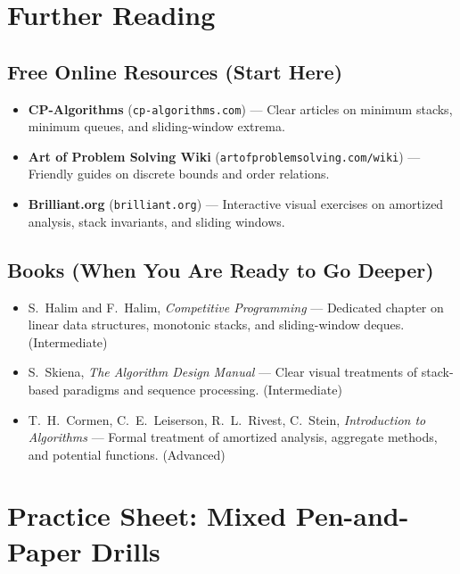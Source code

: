 \documentclass[11pt,a4paper]{article}
\theoremstyle{definition}
\newcounter{exercise}
\begin{document}
\section{Further Reading}

\subsection*{Free Online Resources (Start Here)}
\begin{itemize}
    \item \textbf{CP-Algorithms} (\texttt{cp-algorithms.com}) --- Clear articles on minimum stacks, minimum queues, and sliding-window extrema.
    \item \textbf{Art of Problem Solving Wiki} (\texttt{artofproblemsolving.com/wiki}) --- Friendly guides on discrete bounds and order relations.
    \item \textbf{Brilliant.org} (\texttt{brilliant.org}) --- Interactive visual exercises on amortized analysis, stack invariants, and sliding windows.
\end{itemize}

\subsection*{Books (When You Are Ready to Go Deeper)}
\begin{itemize}
    \item S.\ Halim and F.\ Halim, \emph{Competitive Programming} --- Dedicated chapter on linear data structures, monotonic stacks, and sliding-window deques. (Intermediate)
    \item S.\ Skiena, \emph{The Algorithm Design Manual} --- Clear visual treatments of stack-based paradigms and sequence processing. (Intermediate)
    \item T.\ H.\ Cormen, C.\ E.\ Leiserson, R.\ L.\ Rivest, C.\ Stein, \emph{Introduction to Algorithms} --- Formal treatment of amortized analysis, aggregate methods, and potential functions. (Advanced)
\end{itemize}

\section*{Practice Sheet: Mixed Pen-and-Paper Drills}
\end{document}

